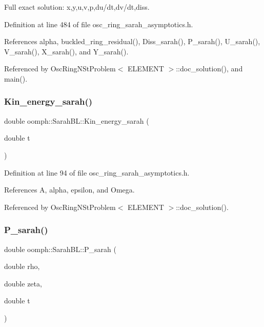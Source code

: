 Full exact solution\+: x,y,u,v,p,du/dt,dv/dt,diss. 



Definition at line 484 of file osc\+\_\+ring\+\_\+sarah\+\_\+asymptotics.\+h.



References alpha, buckled\+\_\+ring\+\_\+residual(), Diss\+\_\+sarah(), P\+\_\+sarah(), U\+\_\+sarah(), V\+\_\+sarah(), X\+\_\+sarah(), and Y\+\_\+sarah().



Referenced by Osc\+Ring\+N\+St\+Problem$<$ E\+L\+E\+M\+E\+N\+T $>$\+::doc\+\_\+solution(), and main().

\mbox{\label{namespaceoomph_1_1SarahBL_a3cb8715d5fa21d7dbff8151e90df4200}} 
\subsubsection{\texorpdfstring{Kin\+\_\+energy\+\_\+sarah()}{Kin\_energy\_sarah()}}
{\footnotesize\ttfamily double oomph\+::\+Sarah\+B\+L\+::\+Kin\+\_\+energy\+\_\+sarah (\begin{DoxyParamCaption}\item[{double}]{t }\end{DoxyParamCaption})}



Definition at line 94 of file osc\+\_\+ring\+\_\+sarah\+\_\+asymptotics.\+h.



References A, alpha, epsilon, and Omega.



Referenced by Osc\+Ring\+N\+St\+Problem$<$ E\+L\+E\+M\+E\+N\+T $>$\+::doc\+\_\+solution().

\mbox{\label{namespaceoomph_1_1SarahBL_a8c9f906a629a8eae5eca6346ccf07040}} 
\subsubsection{\texorpdfstring{P\+\_\+sarah()}{P\_sarah()}}
{\footnotesize\ttfamily double oomph\+::\+Sarah\+B\+L\+::\+P\+\_\+sarah (\begin{DoxyParamCaption}\item[{double}]{rho,  }\item[{double}]{zeta,  }\item[{double}]{t }\end{DoxyParamCaption})}



